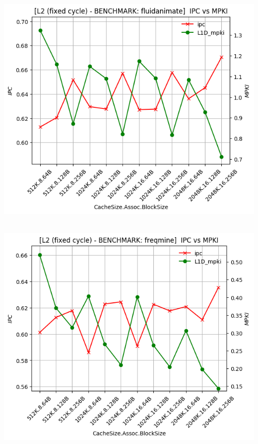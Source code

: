 \begin{minipage}{\textwidth}
    \begin{center}
        \\
        \vspace{3mm}
        \includegraphics[scale=0.70]{graphs/L2/fixed/fluidanimate.png}
        \vspace{6mm}
    \end{center}
\end{minipage}

\begin{minipage}{\textwidth}
    \begin{center}
        \\
        \vspace{3mm}
        \includegraphics[scale=0.70]{graphs/L2/fixed/freqmine.png}
        \vspace{6mm}
    \end{center}
\end{minipage}

